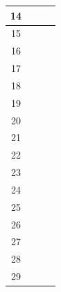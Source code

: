 \begin{table}[]
\begin{tabular}{|c|c|c|c|}
		14 &                                                                                     &              &       \\ \hline
		15 &                                                                                     &              &       \\ \hline
		16 &                                                                                     &              &       \\ \hline
		17 &                                                                                     &              &       \\ \hline
		18 &                                                                                     &              &       \\ \hline
		19 &                                                                                     &              &       \\ \hline
		20 &                                                                                     &              &       \\ \hline
		21 &                                                                                     &              &       \\ \hline
		22 &                                                                                     &              &       \\ \hline
		23 &                                                                                     &              &       \\ \hline
		24 &                                                                                     &              &       \\ \hline
		25 &                                                                                     &              &       \\ \hline
		26 &                                                                                     &              &       \\ \hline
		27 &                                                                                     &              &       \\ \hline
		28 &                                                                                     &              &       \\ \hline
		29 &                                                                                     &              &       \\ \hline

\end{tabular}
\end{table}
